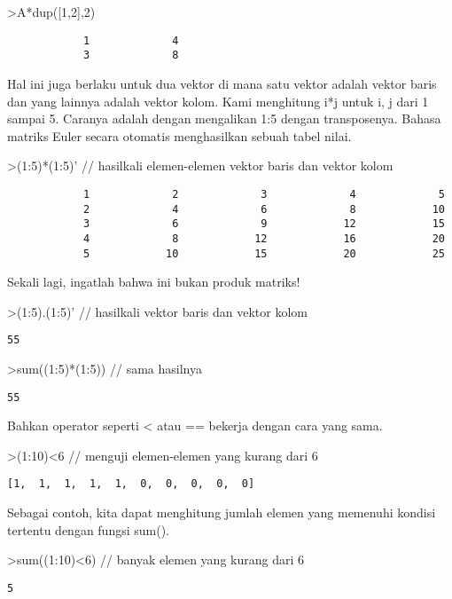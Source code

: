 \documentclass[
]{book}
\begin{document}
\textgreater A*dup({[}1,2{]},2)

\begin{verbatim}
            1             4 
            3             8 
\end{verbatim}

Hal ini juga berlaku untuk dua vektor di mana satu vektor adalah vektor baris dan yang lainnya adalah vektor kolom. Kami menghitung i*j untuk i, j dari 1 sampai 5. Caranya adalah dengan mengalikan 1:5 dengan transposenya. Bahasa matriks Euler secara otomatis menghasilkan sebuah tabel nilai.

\textgreater(1:5)*(1:5)' // hasilkali elemen-elemen vektor baris dan vektor kolom

\begin{verbatim}
            1             2             3             4             5 
            2             4             6             8            10 
            3             6             9            12            15 
            4             8            12            16            20 
            5            10            15            20            25 
\end{verbatim}

Sekali lagi, ingatlah bahwa ini bukan produk matriks!

\textgreater(1:5).(1:5)' // hasilkali vektor baris dan vektor kolom

\begin{verbatim}
55
\end{verbatim}

\textgreater sum((1:5)*(1:5)) // sama hasilnya

\begin{verbatim}
55
\end{verbatim}

Bahkan operator seperti \textless{} atau == bekerja dengan cara yang sama.

\textgreater(1:10)\textless6 // menguji elemen-elemen yang kurang dari 6

\begin{verbatim}
[1,  1,  1,  1,  1,  0,  0,  0,  0,  0]
\end{verbatim}

Sebagai contoh, kita dapat menghitung jumlah elemen yang memenuhi kondisi tertentu dengan fungsi sum().

\textgreater sum((1:10)\textless6) // banyak elemen yang kurang dari 6

\begin{verbatim}
5
\end{verbatim}
\end{document}
